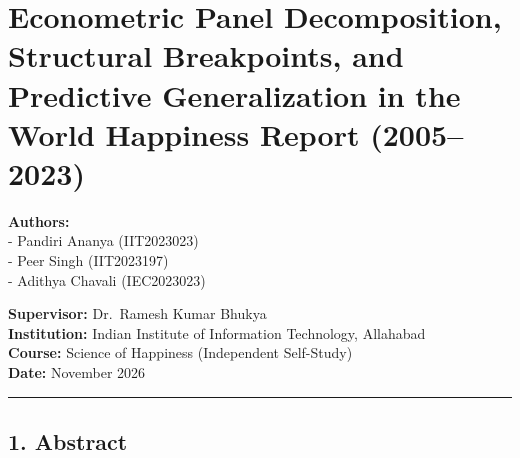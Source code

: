 \documentclass[
]{article}
\author{}
\date{}
\begin{document}
\hypertarget{econometric-panel-decomposition-structural-breakpoints-and-predictive-generalization-in-the-world-happiness-report-20052023}{%
\section{Econometric Panel Decomposition, Structural Breakpoints, and
Predictive Generalization in the World Happiness Report
(2005--2023)}\label{econometric-panel-decomposition-structural-breakpoints-and-predictive-generalization-in-the-world-happiness-report-20052023}}

\textbf{Authors:}\\
- Pandiri Ananya (IIT2023023)\\
- Peer Singh (IIT2023197)\\
- Adithya Chavali (IEC2023023)

\textbf{Supervisor:} Dr.~Ramesh Kumar Bhukya\\
\textbf{Institution:} Indian Institute of Information Technology,
Allahabad\\
\textbf{Course:} Science of Happiness (Independent Self-Study)\\
\textbf{Date:} November 2026

\begin{center}\rule{0.5\linewidth}{0.5pt}\end{center}

\hypertarget{abstract}{%
\subsection{1. Abstract}\label{abstract}}
\end{document}
